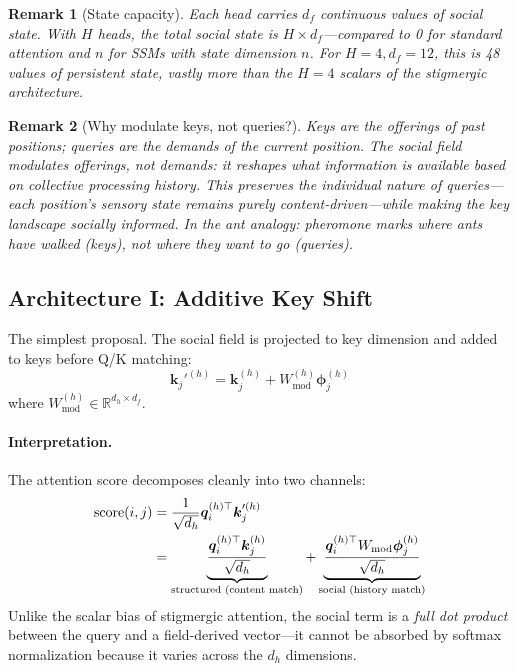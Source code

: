 \documentclass[11pt,a4paper]{article}
\newtheorem{remark}{Remark}
\newcommand{\field}{\bm{\phi}}
\newcommand{\R}{\mathbb{R}}
\newcommand{\q}{\bm{q}}
\newcommand{\K}{\bm{k}}
\begin{document}
\begin{remark}[State capacity]
Each head carries $d_f$ continuous values of social state.  With $H$
heads, the total social state is $H \times d_f$---compared to 0 for
standard attention and $n$ for SSMs with state dimension $n$.  For
$H = 4, d_f = 12$, this is 48 values of persistent state, vastly
more than the $H = 4$ scalars of the stigmergic architecture.
\end{remark}

\begin{remark}[Why modulate keys, not queries?]
\label{rem:keys_not_queries}
Keys are the \emph{offerings} of past positions; queries are the
\emph{demands} of the current position.  The social field modulates
offerings, not demands: it reshapes \emph{what information is
available} based on collective processing history.  This preserves
the individual nature of queries---each position's sensory state
remains purely content-driven---while making the key landscape
socially informed.  In the ant analogy: pheromone marks where ants
\emph{have walked} (keys), not where they \emph{want to go}
(queries).
\end{remark}

\subsection{Architecture I: Additive Key Shift}
\label{sec:arch_additive}

The simplest proposal.  The social field is projected to key dimension
and added to keys before Q/K matching:
\begin{equation}
    \K_j'^{(h)} = \K_j^{(h)} + W_{\text{mod}}^{(h)} \field_j^{(h)}
    \label{eq:additive_mod}
\end{equation}
where $W_{\text{mod}}^{(h)} \in \R^{d_h \times d_f}$.

\paragraph{Interpretation.}  The attention score decomposes cleanly
into two channels:
\begin{align}
    \text{score}(i, j) &= \frac{1}{\sqrt{d_h}} \q_i^{(h)\top}
    \K_j'^{(h)} \notag \\
    &= \underbrace{\frac{\q_i^{(h)\top} \K_j^{(h)}}{\sqrt{d_h}}}_%
    {\text{structured (content match)}}
    + \underbrace{\frac{\q_i^{(h)\top} W_{\text{mod}}
    \field_j^{(h)}}{\sqrt{d_h}}}_{\text{social (history match)}}
    \label{eq:score_decomp}
\end{align}
Unlike the scalar bias of stigmergic attention, the social term is a
\emph{full dot product} between the query and a field-derived
vector---it cannot be absorbed by softmax normalization because it
varies across the $d_h$ dimensions.
\end{document}
